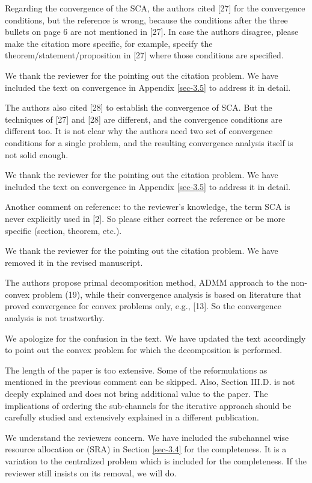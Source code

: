  Regarding the convergence of the SCA, the authors cited [27] for the convergence conditions, but the reference is wrong, because the conditions after the three bullets on page 6 are not mentioned in [27]. In case the authors disagree, please make the citation more specific, for example, specify the theorem/statement/proposition in [27] where those conditions are specified.

\resp We thank the reviewer for the pointing out the citation problem. We have included the text on convergence in Appendix \ref{sec-3.5} to address it in detail.

 The authors also cited [28] to establish the convergence of SCA. But the techniques of [27] and [28] are different, and the convergence conditions are different too. It is not clear why the authors need two set of convergence conditions for a single problem, and the resulting convergence analysis itself is not solid enough.

\resp We thank the reviewer for the pointing out the citation problem. We have included the text on convergence in Appendix \ref{sec-3.5} to address it in detail.

 Another comment on reference: to the reviewer's knowledge, the term SCA is never explicitly used in [2]. So please either correct the reference or be more specific (section, theorem, etc.).

\resp We thank the reviewer for the pointing out the citation problem. We have removed it in the revised manuscript.

 The authors propose primal decomposition method, ADMM approach to the non-convex problem (19), while their convergence analysis is based on literature that proved convergence for convex problems only, e.g., [13]. So the convergence analysis is not trustworthy.

\resp We apologize for the confusion in the text. We have updated the text accordingly to point out the convex problem for which the decomposition is performed.

 The length of the paper is too extensive. Some of the reformulations as mentioned in the previous comment can be skipped. Also, Section III.D. is not deeply explained and does not bring additional value to the paper. The implications of ordering the sub-channels for the iterative approach should be carefully studied and extensively explained in a different publication.

\resp We understand the reviewers concern. We have included the subchannel wise resource allocation or (SRA) in Section \ref{sec-3.4} for the completeness. It is a variation to the centralized problem which is included for the completeness. If the reviewer still insists on its removal, we will do.

